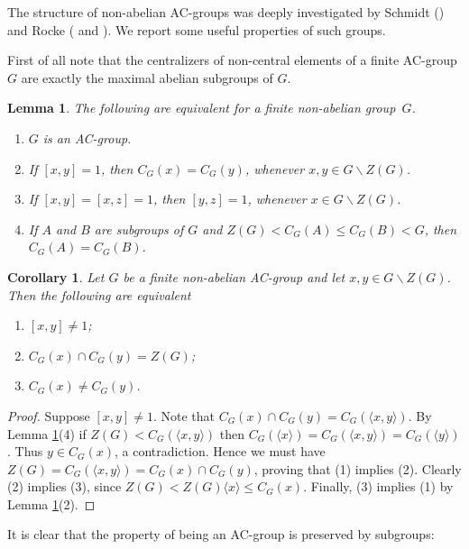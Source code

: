 \documentclass[12pt]{amsart}
\theoremstyle{definition}
\theoremstyle{remark}
\theoremstyle{plain}
\theoremstyle{plain}
\newtheorem{cor}[definition]{Corollary}
\theoremstyle{plain}
\theoremstyle{plain}
\newtheorem{lemma}[definition]{Lemma}
\theoremstyle{plain}
\theoremstyle{remark}
\theoremstyle{remark}
\theoremstyle{definition}
\begin{document}
The structure of non-abelian AC-groups was deeply investigated by Schmidt (\cite{Schmidt1970}) and Rocke (\cite{RockePhD} and \cite{Rocke}). We report some useful properties of such groups.

First of all note that the centralizers of non-central elements of a finite AC-group $G$ are exactly the maximal abelian subgroups of $G$.

\begin{lemma}\cite[Lemma 3.2]{Rocke}\label{first.prop}  The following are equivalent for a finite non-abelian group~$G$.
\begin{enumerate}
\item $G$ is an AC-group.
\item If $[x,y] = 1$, then $C_G(x) = C_G(y)$, whenever $x,y \in G\backslash Z(G)$.
\item If $[x,y] = [x, z] = 1$, then $[y, z] = 1$, whenever $x \in G\backslash Z(G)$.
\item If $A$ and $B$ are subgroups of $G$ and $Z(G) < C_G(A) \leq C_G(B) < G$, then $C_G(A) = C_G(B)$.
\end{enumerate}
\end{lemma}


\begin{cor}\label{centralizers.intersection}
Let $G$ be a finite non-abelian AC-group and let $x,y\in G \backslash Z(G)$. Then the following are equivalent
\begin{enumerate}
\item $[x,y]\neq 1$; 
\item $C_G(x) \cap C_G(y) = Z(G)$;
\item $C_G(x) \neq C_G(y)$.
\end{enumerate} 
\end{cor}


\begin{proof} 
Suppose $[x,y]\neq 1$. Note that $C_G(x) \cap C_G(y) = C_G(\langle x,y\rangle)$. By Lemma \ref{first.prop}(4) if $Z(G) < C_G(\langle x,y\rangle)$ then $C_G(\langle x \rangle )=C_G(\langle x,y\rangle) = C_G(\langle y \rangle)$. Thus $y \in C_G(x)$, a contradiction. Hence we must have $Z(G) = C_G(\langle x,y\rangle) = C_G(x) \cap C_G(y)$, proving that (1) implies (2).
Clearly (2) implies (3), since $Z(G) < Z(G)\langle x\rangle \leq C_G(x)$. Finally, (3) implies (1) by Lemma \ref{first.prop}(2).
\end{proof}

It is clear that the property of being an AC-group is preserved by subgroups:
\end{document}
